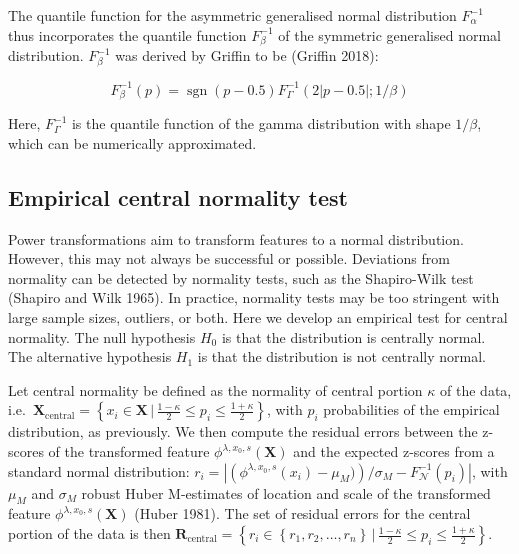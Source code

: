 \documentclass[preprint,12pt,authoryear]{elsarticle}
\DeclareMathOperator{\sgn}{sgn}
\begin{document}
The quantile function for the asymmetric generalised normal distribution
\(F_{\alpha}^{-1}\) thus incorporates the quantile function
\(F_{\beta}^{-1}\) of the symmetric generalised normal distribution.
\(F_{\beta}^{-1}\) was derived by Griffin to be (Griffin 2018):

\begin{equation}
F_{\beta}^{-1}(p) = \sgn\left(p - 0.5 \right) F_{\Gamma}^{-1}\left(2 \left|p - 0.5 \right|; 1 / \beta \right)
\end{equation}

Here, \(F_{\Gamma}^{-1}\) is the quantile function of the gamma
distribution with shape \(1 / \beta\), which can be numerically
approximated.

\subsection{Empirical central normality
test}\label{empirical-central-normality-test}

Power transformations aim to transform features to a normal
distribution. However, this may not always be successful or possible.
Deviations from normality can be detected by normality tests, such as
the Shapiro-Wilk test (Shapiro and Wilk 1965). In practice, normality
tests may be too stringent with large sample sizes, outliers, or both.
Here we develop an empirical test for central normality. The null
hypothesis \(H_0\) is that the distribution is centrally normal. The
alternative hypothesis \(H_1\) is that the distribution is not centrally
normal.

Let central normality be defined as the normality of central portion
\(\kappa\) of the data,
i.e.~\(\mathbf{X}_{\text{central}} = \left\{x_i \in \mathbf{X} \, | \,  \frac{1-\kappa}{2} \leq  p_i \leq \frac{1 + \kappa}{2}\right\}\),
with \(p_i\) probabilities of the empirical distribution, as previously.
We then compute the residual errors between the z-scores of the
transformed feature \(\phi^{\lambda, x_0, s} (\mathbf{X})\) and the
expected z-scores from a standard normal distribution:
\(r_i =\left| \left( \phi^{\lambda, x_0, s}(x_i) - \mu_M)\right) / \sigma_M - F^{-1}_{\mathcal{N}}(p_i) \right|\),
with \(\mu_M\) and \(\sigma_M\) robust Huber M-estimates of location and
scale of the transformed feature \(\phi^{\lambda, x_0, s} (\mathbf{X})\)
(Huber 1981). The set of residual errors for the central portion of the
data is then
\(\mathbf{R}_{\text{central}} = \left\{ r_i \in \left\{ r_1, r_2, \ldots, r_n\right\} \, | \,  \frac{1-\kappa}{2} \leq  p_i \leq \frac{1 + \kappa}{2}\right\}\).
\end{document}
